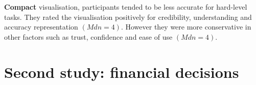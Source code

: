 \documentclass[final,5p,times,twocolumn,authoryear]{elsarticle}
\begin{document}
\textbf{Compact} visualisation, participants tended to be less accurate for hard-level tasks. They rated the visualisation positively for credibility, understanding and accuracy representation $(Mdn = 4)$. However they were more conservative in other factors such as trust, confidence and ease of use $(Mdn = 4)$.












\section{Second study: financial decisions}
\end{document}
